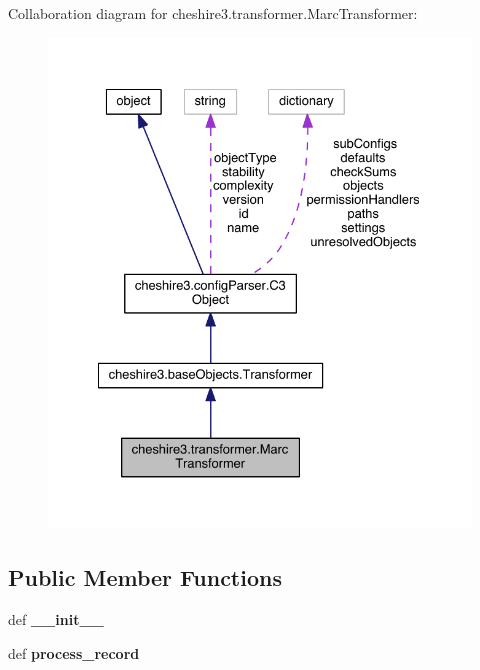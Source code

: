 Collaboration diagram for cheshire3.\-transformer.\-Marc\-Transformer\-:
\nopagebreak
\begin{figure}[H]
\begin{center}
\leavevmode
\includegraphics[width=331pt]{classcheshire3_1_1transformer_1_1_marc_transformer__coll__graph}
\end{center}
\end{figure}
\subsection*{Public Member Functions}
\begin{DoxyCompactItemize}
\item 
\hypertarget{classcheshire3_1_1transformer_1_1_marc_transformer_a2ead25a04f2da3b6cf6d10b9d0a88a7f}{def {\bfseries \-\_\-\-\_\-init\-\_\-\-\_\-}}\label{classcheshire3_1_1transformer_1_1_marc_transformer_a2ead25a04f2da3b6cf6d10b9d0a88a7f}

\item 
\hypertarget{classcheshire3_1_1transformer_1_1_marc_transformer_ae4cc56bf8e118225a76ad2708ef59c76}{def {\bfseries process\-\_\-record}}\label{classcheshire3_1_1transformer_1_1_marc_transformer_ae4cc56bf8e118225a76ad2708ef59c76}

\end{DoxyCompactItemize}
